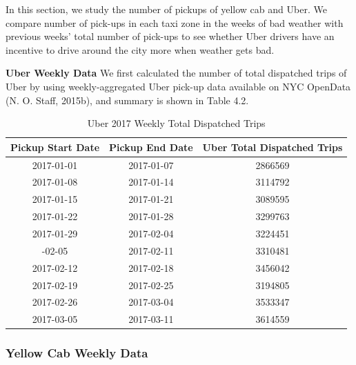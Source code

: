 \documentclass[12pt,twoside]{reedthesis}
\theoremstyle{definition}
\theoremstyle{definition}
\theoremstyle{definition}
\theoremstyle{remark}
\begin{document}
In this section, we study the number of pickups of yellow cab and Uber.
We compare number of pick-ups in each taxi zone in the weeks of bad
weather with previous weeks' total number of pick-ups to see whether
Uber drivers have an incentive to drive around the city more when
weather gets bad.

\textbf{Uber Weekly Data} We first calculated the number of total
dispatched trips of Uber by using weekly-aggregated Uber pick-up data
available on NYC OpenData (N. O. Staff, 2015b), and summary is shown in
Table 4.2.
\begin{table}

\caption{\label{tab:unnamed-chunk-65}Uber 2017 Weekly Total Dispatched Trips}
\centering
\begin{tabular}[t]{ccc}
\toprule
Pickup Start Date & Pickup End Date & Uber Total Dispatched Trips\\
\midrule
2017-01-01 & 2017-01-07 & 2866569\\
2017-01-08 & 2017-01-14 & 3114792\\
2017-01-15 & 2017-01-21 & 3089595\\
2017-01-22 & 2017-01-28 & 3299763\\
2017-01-29 & 2017-02-04 & 3224451\\
\addlinespace
2017-02-05 & 2017-02-11 & 3310481\\
2017-02-12 & 2017-02-18 & 3456042\\
2017-02-19 & 2017-02-25 & 3194805\\
2017-02-26 & 2017-03-04 & 3533347\\
2017-03-05 & 2017-03-11 & 3614559\\
\bottomrule
\end{tabular}
\end{table}
\subsubsection{Yellow Cab Weekly Data}\label{yellow-cab-weekly-data}
\end{document}
